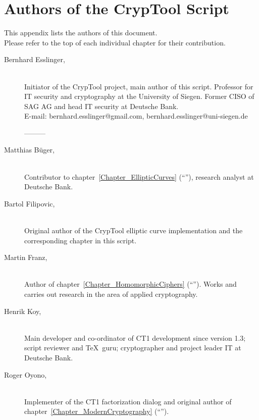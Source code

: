 \newpage
\hypertarget{appendix-authors}{}
\section{Authors of the CrypTool Script}
\label{s:appendix-authors}

This appendix lists the authors of this document.\\
Please refer to the top of each individual chapter for their contribution.

\begin{description}

\item[Bernhard Esslinger,] \mbox{}\\
Initiator of the CrypTool project, main author of this script. Professor for IT security and cryptography at the University of Siegen. Former CISO of SAG AG and head IT security at Deutsche Bank.\\
E-mail: bernhard.esslinger@gmail.com, bernhard.esslinger@uni-siegen.de

---------

\item[Matthias B\"uger,] \mbox{}\\ 
Contributor to chapter~\ref{Chapter_EllipticCurves} (``''),
research analyst at Deutsche Bank.

\item[Bartol Filipovic,] \mbox{}\\
Original author of the CrypTool elliptic curve
implementation and the corresponding chapter in this script.

\item[Martin Franz,] \mbox{}\\
Author of chapter~\ref{Chapter_HomomorphicCiphers}
(``'').
Works and carries out research in the area of applied cryptography.

\item[Henrik Koy,] \mbox{}\\
Main developer and co-ordinator of CT1 development
since version 1.3; script reviewer and \TeX\ guru; cryptographer 
and project leader IT at Deutsche Bank.

\item[Roger Oyono,] \mbox{}\\
Implementer of the CT1 factorization dialog and original author
of chapter~\ref{Chapter_ModernCryptography} (``'').


\end{description}
